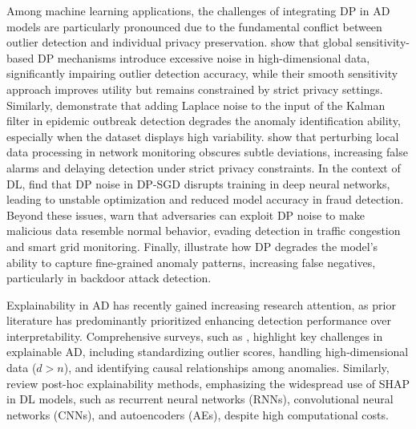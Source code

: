Among machine learning applications, the challenges of integrating DP in AD models are particularly pronounced due to the fundamental conflict between outlier detection and individual privacy preservation. \cite{okada2015differentially} show that global sensitivity-based DP mechanisms introduce excessive noise in high-dimensional data, significantly impairing outlier detection accuracy, while their smooth sensitivity approach improves utility but remains constrained by strict privacy settings. Similarly, \cite{fan2013differentially} demonstrate that adding Laplace noise to the input of the Kalman filter in epidemic outbreak detection degrades the anomaly identification ability, especially when the dataset displays high variability. \cite{kurt2022online} show that perturbing local data processing in network monitoring obscures subtle deviations, increasing false alarms and delaying detection under strict privacy constraints. In the context of DL, \cite{wang2018privacy} find that DP noise in DP-SGD disrupts training in deep neural networks, leading to unstable optimization and reduced model accuracy in fraud detection.  Beyond these issues, \cite{giraldo2020adversarial} warn that adversaries can exploit DP noise to make malicious data resemble normal behavior, evading detection in traffic congestion and smart grid monitoring. Finally, \cite{du2019robust} illustrate how DP degrades the model’s ability to capture fine-grained anomaly patterns, increasing false negatives, particularly in backdoor attack detection.

Explainability in AD has recently gained increasing research attention, as prior literature has predominantly prioritized enhancing detection performance over interpretability. Comprehensive surveys, such as \cite{panjei2022survey}, highlight key challenges in explainable AD, including standardizing outlier scores, handling high-dimensional data ($d > n$), and identifying causal relationships among anomalies. Similarly, \cite{li2023survey} review post-hoc explainability methods, emphasizing the widespread use of SHAP in DL models, such as recurrent neural networks (RNNs), convolutional neural networks (CNNs), and autoencoders (AEs),  despite high computational costs.

